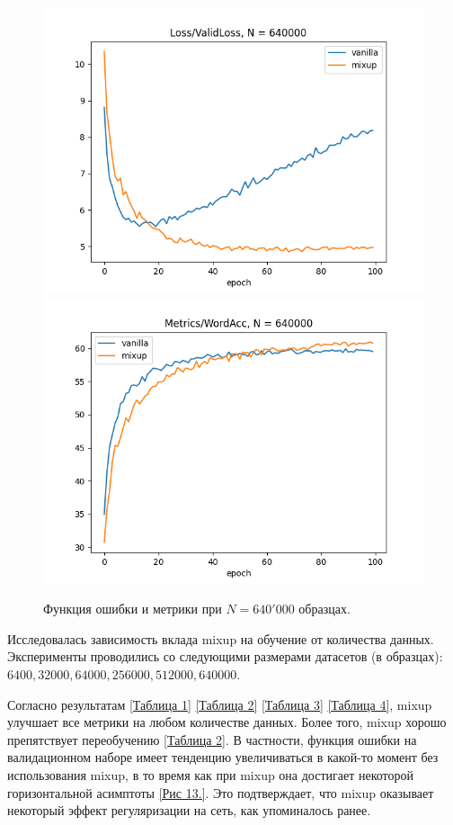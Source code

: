 \begin{figure}
\centering
\includegraphics[scale=0.5]{./images/mixup_size/10000_ValidLoss.png}
\includegraphics[scale=0.5]{./images/mixup_size/10000_WordAcc.png}
\caption{\protect\hypertarget{image14}{Функция ошибки и метрики при $N = 640'000$ образцах}.}
\end{figure}


Исследовалась зависимость вклада mixup на обучение от количества данных. Эксперименты проводились со следующими размерами датасетов (в образцах):\\ $6400, 32000, 64000, 256000, 512000, 640000$.

Согласно результатам \hyperref[tab:mixup_size_max]{[Таблица 1]} \hyperref[tab:mixup_size]{[Таблица 2]} \hyperref[tab:mixup_size_all]{[Таблица 3]} \hyperref[tab:mixup_size_main]{[Таблица 4]}, mixup улучшает все метрики на любом количестве данных. Более того, mixup хорошо препятствует переобучению \hyperref[tab:mixup_size]{[Таблица 2]}. В частности, функция ошибки на валидационном наборе имеет тенденцию увеличиваться в какой-то момент без использования mixup, в то время как при mixup она достигает некоторой горизонтальной асимптоты \hyperlink{image13}{[Рис 13.]}. Это подтверждает, что mixup оказывает некоторый эффект регуляризации на сеть, как упоминалось ранее.

